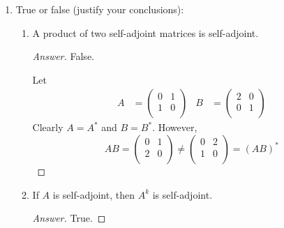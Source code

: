\documentclass[../psets.tex]{subfiles}
\begin{document}
\begin{enumerate}[label={\textbf{2.\arabic*.}}]
\begin{proof}[Answer]
\begin{equation*}
\begin{pmatrix}
                2/\sqrt{5} & 1/\sqrt{5}\\
                -1/\sqrt{5} & 2/\sqrt{5}\\
            \end{pmatrix}
        \end{equation*}
    \end{proof}
    \item True or false (justify your conclusions):
    \begin{enumerate}
        \item A product of two self-adjoint matrices is self-adjoint.
        \begin{proof}[Answer]
            False.\par
            Let
            \begin{align*}
                A &=
                \begin{pmatrix}
                    0 & 1\\
                    1 & 0\\
                \end{pmatrix}&
                B &=
                \begin{pmatrix}
                    2 & 0\\
                    0 & 1\\
                \end{pmatrix}
            \end{align*}
            Clearly $A=A^*$ and $B=B^*$. However,
            \begin{equation*}
                AB =
                \begin{pmatrix}
                    0 & 1\\
                    2 & 0\\
                \end{pmatrix}
                \neq
                \begin{pmatrix}
                    0 & 2\\
                    1 & 0\\
                \end{pmatrix}
                = (AB)^*
            \end{equation*}
        \end{proof}
        \item If $A$ is self-adjoint, then $A^k$ is self-adjoint.
        \begin{proof}[Answer]
            True.\par

\end{proof}
\end{enumerate}
\end{enumerate}
\end{document}
